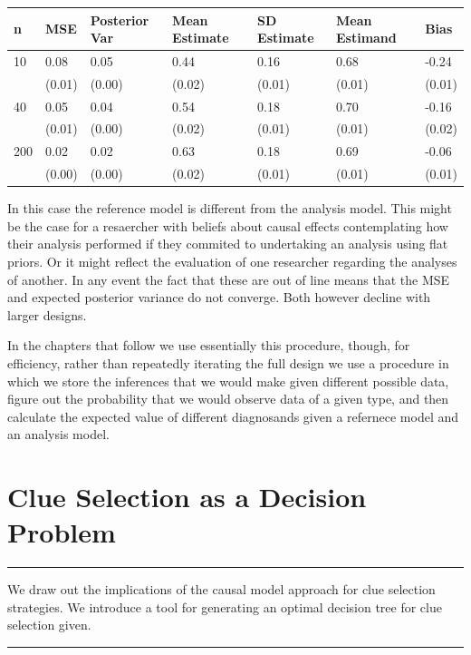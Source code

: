 \documentclass[
  12pt,
]{book}
\begin{document}
\begin{tabular}{l|l|l|l|l|l|l}
\hline
n & MSE & Posterior Var & Mean Estimate & SD Estimate & Mean Estimand & Bias\\
\hline
10 & 0.08 & 0.05 & 0.44 & 0.16 & 0.68 & -0.24\\
\hline
 & (0.01) & (0.00) & (0.02) & (0.01) & (0.01) & (0.01)\\
\hline
40 & 0.05 & 0.04 & 0.54 & 0.18 & 0.70 & -0.16\\
\hline
 & (0.01) & (0.00) & (0.02) & (0.01) & (0.01) & (0.02)\\
\hline
200 & 0.02 & 0.02 & 0.63 & 0.18 & 0.69 & -0.06\\
\hline
 & (0.00) & (0.00) & (0.02) & (0.01) & (0.01) & (0.01)\\
\hline
\end{tabular}

In this case the reference model is different from the analysis model. This might be the case for a resaercher with beliefs about causal effects contemplating how their analysis performed if they commited to undertaking an analysis using flat priors. Or it might reflect the evaluation of one researcher regarding the analyses of another. In any event the fact that these are out of line means that the MSE and expected posterior variance do not converge. Both however decline with larger designs.

In the chapters that follow we use essentially this procedure, though, for efficiency, rather than repeatedly iterating the full design we use a procedure in which we store the inferences that we would make given different possible data, figure out the probability that we would observe data of a given type, and then calculate the expected value of different diagnosands given a refernece model and an analysis model.

\hypertarget{clue}{%
\chapter{Clue Selection as a Decision Problem}\label{clue}}

\begin{center}\rule{0.5\linewidth}{0.5pt}\end{center}

We draw out the implications of the causal model approach for clue selection strategies. We introduce a tool for generating an optimal decision tree for clue selection given.

\begin{center}\rule{0.5\linewidth}{0.5pt}\end{center}
\end{document}
